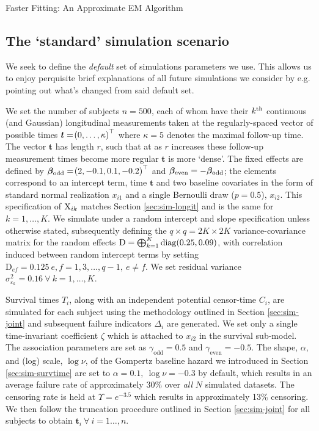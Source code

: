 \begin{chapter}{\label{cha:approx}Faster Fitting: An Approximate EM Algorithm}
  \subsection{The `standard' simulation scenario}\label{sec:approx-simsetup-proper}
  We seek to define the \textit{default} set of simulations parameters we use. This allows us to enjoy perquisite brief explanations of all future simulations we consider by e.g. pointing out what's changed from said default set. 
  
  We set the number of subjects $n=500$, each of whom have their $k^{\text{th}}$ continuous (and Gaussian) longitudinal measurements taken at the regularly-spaced vector of possible times $\bm{t}=\!\left(0,\dots,\kappa\right)^\top$ where $\kappa=5$ denotes the maximal follow-up time. The vector $\bm{t}$ has length $r$, such that at as $r$ increases these follow-up measurement times become more regular \ie $\bm{t}$ is more `dense'. The fixed effects are defined by $\bm{\beta}_{\mathrm{odd}}=\!\left(2, -0.1, 0.1, -0.2\right)^\top$ and $\bm{\beta}_{\mathrm{even}}=-\bm{\beta}_{\mathrm{odd}}$; the elements correspond to an intercept term, time $\bm{t}$ and two baseline covariates in the form of standard normal realization $x_{i1}$ and a single Bernoulli draw ($p=0.5$), $x_{i2}$. This specification of $\mathrm{X}_{ik}$ matches Section \ref{sec:sim-longit} and is the same for $k=1,\dots,K$. We simulate under a random intercept and slope specification unless otherwise stated, subsequently defining the $q\times q = 2K\times2K$ variance-covariance matrix for the random effects $\mathrm{D} = \bigoplus_{k=1}^K \mathrm{diag}\!\left(0.25, 0.09\right)$, with correlation induced between random intercept terms by setting $\mathrm{D}_{ef}=0.125\ e,f=1, 3, \dots, q-1,\ e\neq f$. We set residual variance $\sigma^2_{\varepsilon_k}=0.16\ \forall\ k=1,\dots,K$.

  Survival times $T_i$, along with an independent potential censor-time $C_i$, are simulated for each subject using the methodology outlined in Section \ref{sec:sim-joint} and subsequent failure indicators $\Delta_i$ are generated. We set only a single time-invariant coefficient $\zeta$ which is attached to $x_{i2}$ in the survival sub-model. The association parameters are set as $\gamma_{\mathrm{odd}}=0.5$ and $\gamma_\mathrm{even}=-0.5$. The shape, $\alpha$, and (log) scale, $\log\nu$, of the Gompertz baseline hazard we introduced in Section \ref{sec:sim-survtime} are set to $\alpha=0.1,\ \log\nu=-0.3$ by default, which results in an average failure rate of approximately 30\% over \textit{all} $N$ simulated datasets. The censoring rate is held at $\Upsilon=e^{-3.5}$ which results in approximately 13\% censoring. We then follow the truncation procedure outlined in Section \ref{sec:sim-joint} for all subjects to obtain $\bm{t}_i\ \forall\ i=1\dots,n$.


\end{chapter}
